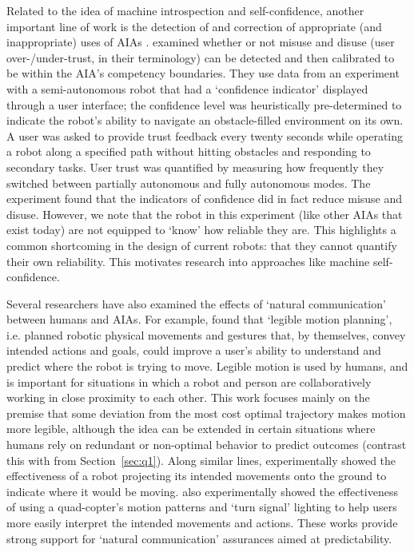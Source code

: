 Related to the idea of machine introspection and self-confidence, another important line of work is the detection of and correction of appropriate (and inappropriate) uses of AIAs \cite{Muir1994-ow,Kaniarasu2013-ho}. 
\citet{Kaniarasu2013-ho} examined whether or not misuse and disuse (user over-/under-trust, in their terminology) can be detected and then calibrated to be within the AIA's competency boundaries. 
They use data from an experiment with a semi-autonomous robot that had a `confidence indicator' displayed through a user interface; the confidence level was heuristically pre-determined to indicate the robot's ability to navigate an obstacle-filled environment on its own. 
A user was asked to provide trust feedback every twenty seconds while operating a robot along a specified path without hitting obstacles and responding to secondary tasks. 
User trust was quantified by measuring how frequently they switched between partially autonomous and fully autonomous modes. The experiment found that the indicators of confidence did in fact reduce misuse and disuse. 
However, we note that the robot in this experiment (like other AIAs that exist today) are not equipped to `know' how reliable they are. This highlights a common shortcoming in the design of current robots: that they cannot quantify their own reliability. This motivates research into approaches like machine self-confidence. 

Several researchers have also examined the effects of `natural communication' between humans and AIAs. %
For example, \citet{Dragan2013-wd} found that `legible motion planning', i.e. planned robotic physical movements and gestures that, by themselves, convey intended actions and goals, could improve a user's ability to understand and predict where the robot is trying to move. 
Legible motion is used by humans, and is important for situations in which a robot and person are collaboratively working in close proximity to each other. %
This work focuses mainly on the premise that some deviation from the most cost optimal trajectory makes motion more legible, although the idea can be extended in certain situations where humans rely on redundant or non-optimal behavior to predict outcomes (contrast this with \citet{Wu2016-ei} from Section~\ref{sec:q1}). 
Along similar lines, \citet{Chadalavada2015-wx} experimentally showed the effectiveness of a robot projecting its intended movements onto the ground to indicate where it would be moving.  %
\citet{Szafir2014-ok,Szafir2015-iy} also experimentally showed the effectiveness of using a quad-copter's motion patterns and `turn signal' lighting to help users more easily interpret the intended movements and actions. 
These works provide strong support for `natural communication' assurances aimed at predictability. 

